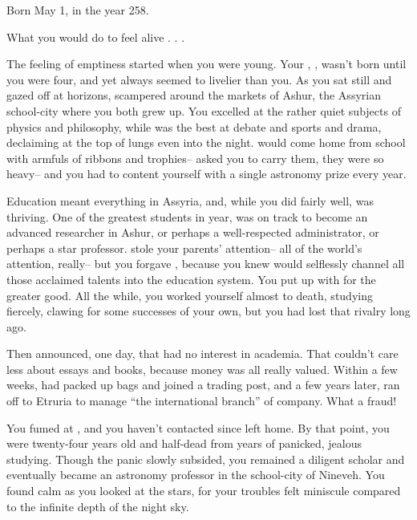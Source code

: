 \documentclass[char]{Kos}
\begin{document}
\name{\cAnarchist{}}

Born May 1, in the year 258.

What you would do to feel alive . . .

The feeling of emptiness started when you were young. Your \cMerchant{\sibling}, \cMerchant{}, wasn't born until you were four, and yet \cMerchant{\they} always seemed to livelier than you. As you sat still and gazed off at horizons, \cMerchant{\they} scampered around the markets of Ashur, the Assyrian school-city where you both grew up. You excelled at the rather quiet subjects of physics and philosophy, while \cMerchant{\they} was the best at debate and sports and drama, declaiming at the top of \cMerchant{\their} lungs even into the night. \cMerchant{\They} would come home from school with armfuls of ribbons and trophies-- \cMerchant{\they} asked you to carry them, they were so heavy-- and you had to content yourself with a single astronomy prize every year.

Education meant everything in Assyria, and, while you did fairly well, \cMerchant{} was thriving. One of the greatest students in \cMerchant{\their} year, \cMerchant{\they} was on track to become an advanced researcher in Ashur, or perhaps a well-respected administrator, or perhaps a star professor. \cMerchant{\They} stole your parents' attention-- all of the world's attention, really-- but you forgave \cMerchant{\them}, because you knew \cMerchant{\they} would selflessly channel all those acclaimed talents into the education system. You put up with \cMerchant{\them} for the greater good. All the while, you worked yourself almost to death, studying fiercely, clawing for some successes of your own, but you had lost that rivalry long ago.

Then \cMerchant{\they} announced, one day, that \cMerchant{\they} had no interest in academia. That \cMerchant{\they} couldn't care less about essays and books, because money was all \cMerchant{\they} really valued. Within a few weeks, \cMerchant{\they} had packed up \cMerchant{\their} bags and joined a trading post, and a few years later, \cMerchant{\they} ran off to Etruria to manage ``the international branch'' of \cMerchant{\their} company. What a fraud!

You fumed at \cMerchant{\them}, and you haven't contacted \cMerchant{\them} since \cMerchant{\they} left home. By that point, you were twenty-four years old and half-dead from years of panicked, jealous studying. Though the panic slowly subsided, you remained a diligent scholar and eventually became an astronomy professor in the school-city of Nineveh. You found calm as you looked at the stars, for your troubles felt miniscule compared to the infinite depth of the night sky.
\end{document}
